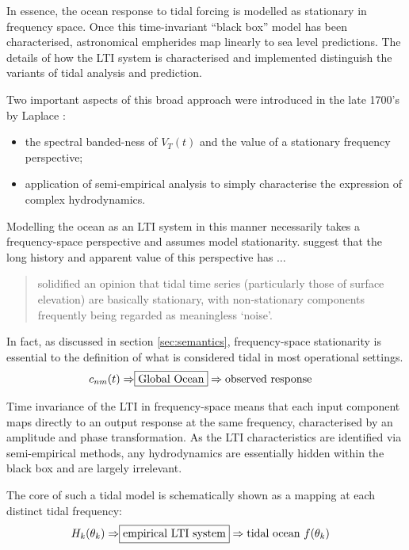 In essence, the ocean response to tidal forcing is modelled as stationary in frequency space.  Once this time-invariant ``black box'' model has been characterised, astronomical empherides map linearly to sea level predictions.  The details of how the LTI system is characterised and implemented distinguish the variants of tidal analysis and prediction.

Two important aspects of this broad approach were introduced in the late 1700's by Laplace \citep[chpt 7]{Cartwright:2000tt}:
\begin{itemize}
    \item the spectral banded-ness of $V_T(t)$ and the value of a stationary frequency perspective;
    \item application of semi-empirical analysis to simply characterise the expression of complex hydrodynamics. 
\end{itemize}

Modelling the ocean as an LTI system in this manner necessarily takes a frequency-space perspective and assumes model stationarity. \citet{Jay:2003bj} suggest that the long history and apparent value of this perspective has $\dots$
\begin{quotation} \noindent
solidified an opinion that tidal time series (particularly those of surface elevation) are basically stationary, with non-stationary components frequently being regarded as meaningless `noise'.    
\end{quotation}
In fact, as discussed in section \ref{sec:semantics}, frequency-space stationarity is essential to the definition of what is considered tidal in most operational settings.
\begin{align}
    c_{nm}(t) \Rightarrow & \fbox{Global Ocean}\Rightarrow \mbox{observed response} \nonumber
\end{align}

Time invariance of the LTI in frequency-space means that each input component maps directly to an output response at the same frequency, characterised by an amplitude and phase transformation.   As the LTI characteristics are identified via semi-empirical methods, any hydrodynamics are essentially hidden within the black box and are largely irrelevant.

The core of such a tidal model is schematically shown as a mapping at each distinct tidal frequency:
\begin{align}
    H_{k}(\theta_k) \Rightarrow & \fbox{empirical LTI system} \Rightarrow \mbox{tidal ocean $f(\theta_k)$}  %
    \label{eq:LTI}
\end{align}

